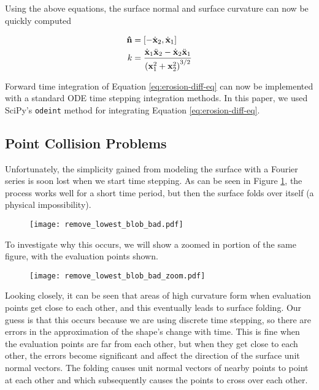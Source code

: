 Using the above equations, the surface normal and surface curvature can now be quickly computed

\begin{align}
  \bhat{n}& = [-\dot{\bvec{x}}_2, \dot{\bvec{x}}_1]\\
  k& = \frac{\dot{\bvec{x}}_1 \ddot{\bvec{x}}_2 - \dot{\bvec{x}}_2 \ddot{\bvec{x}}_1}{\paren{\bvec{x}_1^2 + \bvec{x}_2^2}^{3/2}}
\end{align}

Forward time integration of Equation \ref{eq:erosion-diff-eq} can now be implemented with a standard ODE time stepping integration methods. In this paper, we used SciPy's {\tt odeint} method for integrating Equation \ref{eq:erosion-diff-eq}.

\subsection*{Point Collision Problems}

Unfortunately, the simplicity gained from modeling the surface with a Fourier series is soon lost when we start time stepping. As can be seen in Figure \ref{fig:remove-lowest-blob-bad}, the process works well for a short time period, but then the surface folds over itself (a physical impossibility).

\begin{figure}[H]
    \begin{center}
      \texttt{[image: remove\_lowest\_blob\_bad.pdf]}
    \end{center}
  \vspace{-.2in} %
  \caption{\label{fig:remove-lowest-blob-bad}}
\end{figure}

To investigate why this occurs, we will show a zoomed in portion of the same figure, with the evaluation points shown. 

\begin{figure}[H]
    \begin{center}
      \texttt{[image: remove\_lowest\_blob\_bad\_zoom.pdf]}
    \end{center}
  \vspace{-.2in} %
  \caption{\label{fig:remove-lowest-blog-bad-zoom}}
\end{figure}

Looking closely, it can be seen that areas of high curvature form when evaluation points get close to each other, and this eventually leads to surface folding. Our guess is that this occurs because we are using discrete time stepping, so there are errors in the approximation of the shape's change with time. This is fine when the evaluation points are far from each other, but when they get close to each other, the errors become significant and affect the direction of the surface unit normal vectors. The folding causes unit normal vectors of nearby points to point at each other and which subsequently causes the points to cross over each other.

